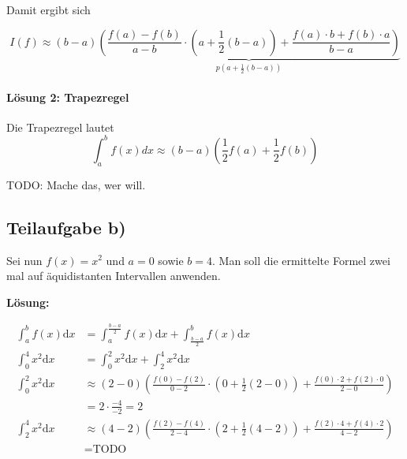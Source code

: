 Damit ergibt sich

\[I(f) \approx (b-a) \underbrace{(\frac{f(a) - f(b)}{a - b} \cdot (a + \frac{1}{2}(b-a)) + \frac{f(a) \cdot b + f(b) \cdot a}{b-a})}_{p(a + \frac{1}{2}(b-a))}\]

\paragraph{Lösung 2: Trapezregel}
Die Trapezregel lautet
\[\int_a^b f(x) dx \approx (b-a) \left (\frac{1}{2}f(a) + \frac{1}{2} f(b) \right )\]

TODO: Mache das, wer will.

\subsection*{Teilaufgabe b)}
Sei nun $f(x) = x^2$ und $a = 0$ sowie $b = 4$. Man soll die ermittelte
Formel zwei mal auf äquidistanten Intervallen anwenden.

\textbf{Lösung:}

\begin{align}
	\int_a^b f(x)\mathrm{d}x &=\int_a^{\frac{b-a}{2}} f(x) \mathrm{d}x + \int_{\frac{b-a}{2}}^b f(x) \mathrm{d}x\\
	\int_0^4 x^2 \mathrm{d}x &=\int_0^2 x^2 \mathrm{d}x + \int_2^4 x^2 \mathrm{d}x\\
	\int_0^2 x^2 \mathrm{d}x &\approx (2-0) (\frac{f(0) - f(2)}{0 - 2} \cdot (0 + \frac{1}{2}(2-0)) + \frac{f(0) \cdot 2 + f(2) \cdot 0}{2-0})\\
		&= 2 \cdot \frac{-4}{-2} = 2\\
	\int_2^4 x^2 \mathrm{d}x &\approx (4-2) (\frac{f(2) - f(4)}{2 - 4} \cdot (2 + \frac{1}{2}(4-2)) + \frac{f(2) \cdot 4 + f(4) \cdot 2}{4-2})\\
		&= \text{TODO}
\end{align}

